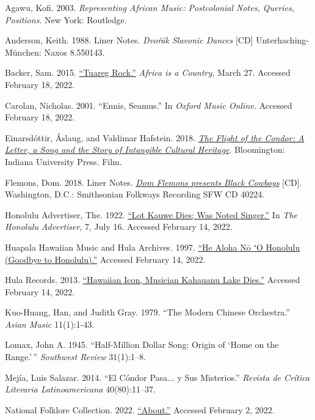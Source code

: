\documentclass[twoside]{article}
\begin{document}
\begin{hangparas}{15pt}{1}

Agawu, Kofi. 2003. \emph{Representing African Music:
Postcolonial Notes, Queries, Positions}. New York: Routledge.

Anderson, Keith. 1988. Liner Notes. \emph{Dvo\v{r}ák Slavonic
Dances} {[}CD{]} Unterhaching-München: Naxos 8.550143.

Backer, Sam. 2015. \href{https://africasacountry.com/2015/03/the-unexpected-popularity-of-dire-straits-in-north-african-tuareg-communities}{``Tuareg Rock.''} \emph{Africa is a Country}, March 27. Accessed February 18, 2022.

Carolan, Nicholas. 2001. ``Ennis, Seamus.'' In \emph{Oxford
Music Online.} Accessed February 18, 2022.~

​​Einarsdóttir, Áslaug, and Valdimar Hafstein. 2018. \href{http://flightofthecondorfilm.com}{\emph{The Flight of the Condor: A Letter, a Song and the Story of Intangible Cultural Heritage}}. Bloomington: Indiana University Press. Film.

Flemons, Dom. 2018. Liner Notes. \href{https://folkways.si.edu/dom-flemons/black-cowboys}{\emph{Dom Flemons presents Black Cowboys}} {[}CD{]}. Washington, D.C.: Smithsonian Folkways Recording SFW CD 40224.

Honolulu Advertiser, The. 1922. \href{https://www.newspapers.com/clip/27904443/1922-lot-kauwe-obituary}{``Lot Kauwe Dies; Was Noted Singer.''} In \emph{The Honolulu Advertiser}, 7, July 16. Accessed February 14, 2022.

Huapala Hawaiian Music and Hula Archives\emph{.} 1997. \href{http://www.huapala.org/Hea/Healoha/_No/_Honolulu.html}{``He Aloha Nō ʻO Honolulu (Goodbye to Honolulu).''} Accessed February 14, 2022.

Hula Records. 2013. \href{http://hularecords.com//_clientData//_ao/_Ecom/obit2.html}{``Hawaiian Icon, Musician Kahauanu Lake Dies.''} Accessed February 14, 2022.

Kuo-Huang, Han, and Judith Gray. 1979. ``The Modern Chinese
Orchestra.'' \emph{Asian Music} 11(1):1-43.

Lomax, John A. 1945. ``Half-Million Dollar Song: Origin of
`Home on the Range.'\,'' \emph{Southwest Review} 31(1):1--8.

Mejía, Luis Salazar. 2014. ``El Cóndor Pasa... y Sus
Misterios.'' \emph{Revista de Crítica Literaria Latinoamericana}
40(80):11--37.

National Folklore Collection. 2022. \href{https://www.duchas.ie/en/info/cbe}{``About.''} Accessed
February 2, 2022.


\end{hangparas}
\end{document}
